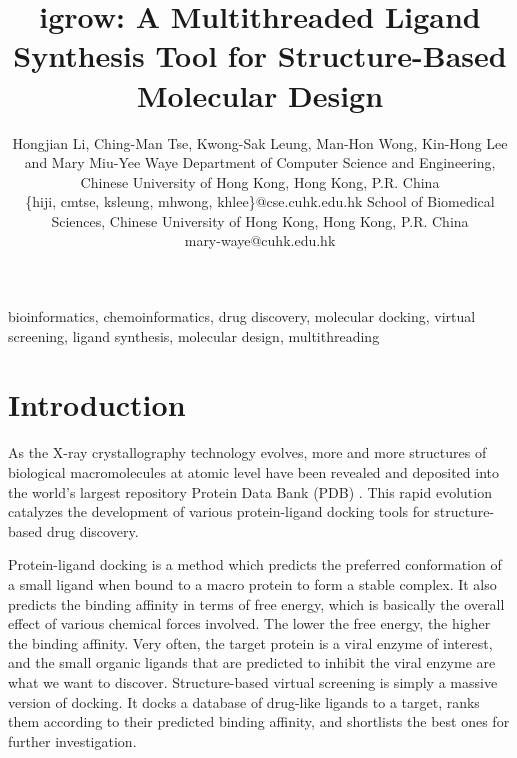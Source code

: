\documentclass[10pt, conference, compsocconf]{IEEEtran}
\begin{document}
\title{igrow: A Multithreaded Ligand Synthesis Tool for Structure-Based Molecular Design} %
\author
{
\IEEEauthorblockN
{
Hongjian Li, Ching-Man Tse, Kwong-Sak Leung, Man-Hon Wong, Kin-Hong Lee and Mary Miu-Yee Waye
\IEEEauthorblockA
{
Department of Computer Science and Engineering, Chinese University of Hong Kong, Hong Kong, P.R. China\\
\{hiji, cmtse, ksleung, mhwong, khlee\}@cse.cuhk.edu.hk
}
\IEEEauthorblockA
{
School of Biomedical Sciences, Chinese University of Hong Kong, Hong Kong, P.R. China\\
mary-waye@cuhk.edu.hk
}
}
}
\maketitle

\begin{abstract}



\end{abstract}

\begin{IEEEkeywords}

bioinformatics, chemoinformatics, drug discovery, molecular docking, virtual screening, ligand synthesis, molecular design, multithreading

\end{IEEEkeywords}

\section{Introduction}

As the X-ray crystallography technology evolves, more and more structures of biological macromolecules at atomic level have been revealed and deposited into the world's largest repository Protein Data Bank (PDB) \cite{539,537}. This rapid evolution catalyzes the development of various protein-ligand docking tools for structure-based drug discovery.

Protein-ligand docking is a method which predicts the preferred conformation of a small ligand when bound to a macro protein to form a stable complex. It also predicts the binding affinity in terms of free energy, which is basically the overall effect of various chemical forces involved. The lower the free energy, the higher the binding affinity. Very often, the target protein is a viral enzyme of interest, and the small organic ligands that are predicted to inhibit the viral enzyme are what we want to discover. Structure-based virtual screening is simply a massive version of docking. It docks a database of drug-like ligands to a target, ranks them according to their predicted binding affinity, and shortlists the best ones for further investigation.
\end{document}
